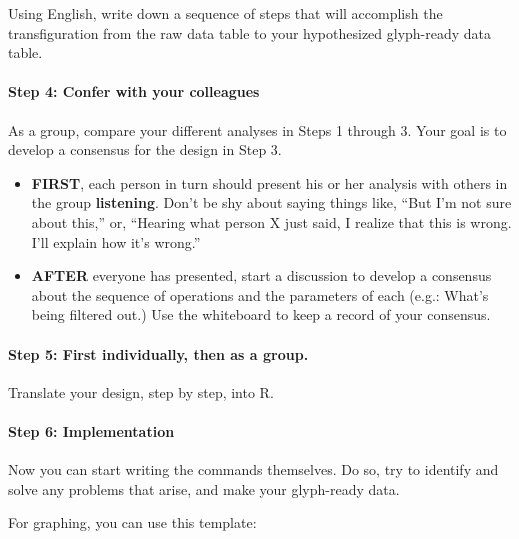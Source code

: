 \documentclass[]{article}
\newenvironment{Shaded}{\begin{snugshade}}{\end{snugshade}}
\newcommand{\KeywordTok}[1]{\textcolor[rgb]{0.13,0.29,0.53}{\textbf{{#1}}}}
\newcommand{\DataTypeTok}[1]{\textcolor[rgb]{0.13,0.29,0.53}{{#1}}}
\newcommand{\DecValTok}[1]{\textcolor[rgb]{0.00,0.00,0.81}{{#1}}}
\newcommand{\StringTok}[1]{\textcolor[rgb]{0.31,0.60,0.02}{{#1}}}
\newcommand{\NormalTok}[1]{{#1}}
\begin{document}
Using English, write down a sequence of steps that will accomplish the
transfiguration from the raw data table to your hypothesized glyph-ready
data table.

\paragraph{Step 4: Confer with your
colleagues}\label{step-4-confer-with-your-colleagues}

As a group, compare your different analyses in Steps 1 through 3. Your
goal is to develop a consensus for the design in Step 3.

\begin{itemize}
\item
  \textbf{FIRST}, each person in turn should present his or her analysis
  with others in the group \textbf{listening}. Don't be shy about saying
  things like, ``But I'm not sure about this,'' or, ``Hearing what
  person X just said, I realize that this is wrong. I'll explain how
  it's wrong.''
\item
  \textbf{AFTER} everyone has presented, start a discussion to develop a
  consensus about the sequence of operations and the parameters of each
  (e.g.: What's being filtered out.) Use the whiteboard to keep a record
  of your consensus.
\end{itemize}

\paragraph{Step 5: First individually, then as a
group.}\label{step-5-first-individually-then-as-a-group.}

Translate your design, step by step, into R.

\paragraph{Step 6: Implementation}\label{step-6-implementation}

Now you can start writing the commands themselves. Do so, try to
identify and solve any problems that arise, and make your glyph-ready
data.

For graphing, you can use this template:

\begin{Shaded}
\end{Shaded}
\end{document}
